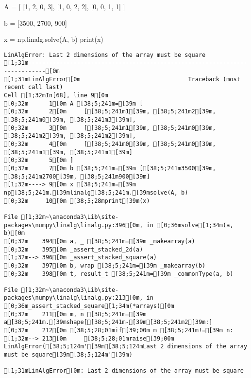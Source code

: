 \documentclass[
  letterpaper,
  DIV=11,
  numbers=noendperiod]{scrartcl}
\newenvironment{Shaded}{\begin{snugshade}}{\end{snugshade}}
\newcommand{\BuiltInTok}[1]{\textcolor[rgb]{0.00,0.23,0.31}{#1}}
\newcommand{\DecValTok}[1]{\textcolor[rgb]{0.68,0.00,0.00}{#1}}
\newcommand{\NormalTok}[1]{\textcolor[rgb]{0.00,0.23,0.31}{#1}}
\newcommand{\OperatorTok}[1]{\textcolor[rgb]{0.37,0.37,0.37}{#1}}
\begin{document}
\begin{Shaded}
\begin{Highlighting}[]

\NormalTok{A }\OperatorTok{=}\NormalTok{ [}
\NormalTok{    [}\DecValTok{1}\NormalTok{, }\DecValTok{2}\NormalTok{, }\DecValTok{0}\NormalTok{, }\DecValTok{3}\NormalTok{],}
\NormalTok{    [}\DecValTok{1}\NormalTok{, }\DecValTok{0}\NormalTok{, }\DecValTok{2}\NormalTok{, }\DecValTok{2}\NormalTok{],}
\NormalTok{    [}\DecValTok{0}\NormalTok{, }\DecValTok{0}\NormalTok{, }\DecValTok{1}\NormalTok{, }\DecValTok{1}\NormalTok{]}
\NormalTok{]}

\NormalTok{b }\OperatorTok{=}\NormalTok{ [}\DecValTok{3500}\NormalTok{, }\DecValTok{2700}\NormalTok{, }\DecValTok{900}\NormalTok{]}

\NormalTok{x }\OperatorTok{=}\NormalTok{ np.linalg.solve(A, b)}
\BuiltInTok{print}\NormalTok{(x)}
\end{Highlighting}
\end{Shaded}

\begin{verbatim}
LinAlgError: Last 2 dimensions of the array must be square
[1;31m---------------------------------------------------------------------------[0m
[1;31mLinAlgError[0m                               Traceback (most recent call last)
Cell [1;32mIn[68], line 9[0m
[0;32m      1[0m A [38;5;241m=[39m [
[0;32m      2[0m     [[38;5;241m1[39m, [38;5;241m2[39m, [38;5;241m0[39m, [38;5;241m3[39m],
[0;32m      3[0m     [[38;5;241m1[39m, [38;5;241m0[39m, [38;5;241m2[39m, [38;5;241m2[39m],
[0;32m      4[0m     [[38;5;241m0[39m, [38;5;241m0[39m, [38;5;241m1[39m, [38;5;241m1[39m]
[0;32m      5[0m ]
[0;32m      7[0m b [38;5;241m=[39m [[38;5;241m3500[39m, [38;5;241m2700[39m, [38;5;241m900[39m]
[1;32m----> 9[0m x [38;5;241m=[39m np[38;5;241m.[39mlinalg[38;5;241m.[39msolve(A, b)
[0;32m     10[0m [38;5;28mprint[39m(x)

File [1;32m~\anaconda3\Lib\site-packages\numpy\linalg\linalg.py:396[0m, in [0;36msolve[1;34m(a, b)[0m
[0;32m    394[0m a, _ [38;5;241m=[39m _makearray(a)
[0;32m    395[0m _assert_stacked_2d(a)
[1;32m--> 396[0m _assert_stacked_square(a)
[0;32m    397[0m b, wrap [38;5;241m=[39m _makearray(b)
[0;32m    398[0m t, result_t [38;5;241m=[39m _commonType(a, b)

File [1;32m~\anaconda3\Lib\site-packages\numpy\linalg\linalg.py:213[0m, in [0;36m_assert_stacked_square[1;34m(*arrays)[0m
[0;32m    211[0m m, n [38;5;241m=[39m a[38;5;241m.[39mshape[[38;5;241m-[39m[38;5;241m2[39m:]
[0;32m    212[0m [38;5;28;01mif[39;00m m [38;5;241m!=[39m n:
[1;32m--> 213[0m     [38;5;28;01mraise[39;00m LinAlgError([38;5;124m'[39m[38;5;124mLast 2 dimensions of the array must be square[39m[38;5;124m'[39m)

[1;31mLinAlgError[0m: Last 2 dimensions of the array must be square
\end{verbatim}
\end{document}
